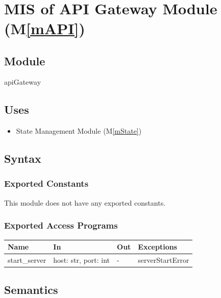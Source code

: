 \documentclass[12pt, titlepage]{article}
\newcommand{\mref}[1]{M\ref{#1}}
\begin{document}
\ \


\section{MIS of API Gateway Module (\mref{mAPI})}

\subsection{Module}

apiGateway

\subsection{Uses}

\begin{itemize}
  \item State Management Module (\mref{mState})
\end{itemize}

\subsection{Syntax}

\subsubsection{Exported Constants}

This module does not have any exported constants.

\subsubsection{Exported Access Programs}

\begin{center}
  \begin{tabular}{p{3cm} p{4cm} p{4cm} p{3.5cm}}
    \hline
    \textbf{Name} & \textbf{In}          & \textbf{Out} & \textbf{Exceptions} \\
    \hline
    start\_server & host: str, port: int & -            & serverStartError    \\
    \hline
  \end{tabular}
\end{center}

\subsection{Semantics}
\end{document}
